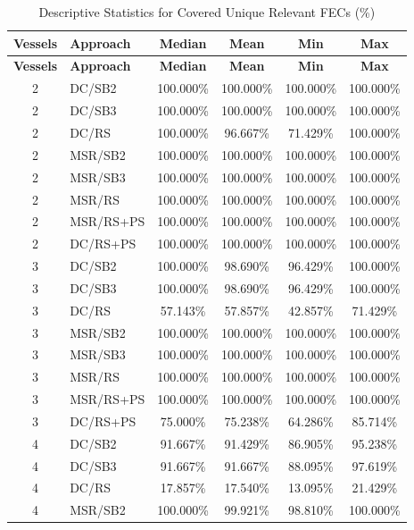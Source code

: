 \documentclass[10pt,a4paper]{article}
\begin{document}
\begin{longtable}{c l c c c c}
\caption{Descriptive Statistics for Covered Unique Relevant FECs (\%)} \\
\toprule
\textbf{Vessels} & \textbf{Approach} & \textbf{Median} & \textbf{Mean} & \textbf{Min} & \textbf{Max} \\
\midrule
\endfirsthead
\toprule
\textbf{Vessels} & \textbf{Approach} & \textbf{Median} & \textbf{Mean} & \textbf{Min} & \textbf{Max} \\
\midrule
\endhead
\bottomrule
\endfoot

2 & DC/SB2 & 100.000\% & 100.000\% & 100.000\% & 100.000\% \\
2 & DC/SB3 & 100.000\% & 100.000\% & 100.000\% & 100.000\% \\
2 & DC/RS & 100.000\% & 96.667\% & 71.429\% & 100.000\% \\
2 & MSR/SB2 & 100.000\% & 100.000\% & 100.000\% & 100.000\% \\
2 & MSR/SB3 & 100.000\% & 100.000\% & 100.000\% & 100.000\% \\
2 & MSR/RS & 100.000\% & 100.000\% & 100.000\% & 100.000\% \\
2 & MSR/RS+PS & 100.000\% & 100.000\% & 100.000\% & 100.000\% \\
2 & DC/RS+PS & 100.000\% & 100.000\% & 100.000\% & 100.000\% \\
\midrule
3 & DC/SB2 & 100.000\% & 98.690\% & 96.429\% & 100.000\% \\
3 & DC/SB3 & 100.000\% & 98.690\% & 96.429\% & 100.000\% \\
3 & DC/RS & 57.143\% & 57.857\% & 42.857\% & 71.429\% \\
3 & MSR/SB2 & 100.000\% & 100.000\% & 100.000\% & 100.000\% \\
3 & MSR/SB3 & 100.000\% & 100.000\% & 100.000\% & 100.000\% \\
3 & MSR/RS & 100.000\% & 100.000\% & 100.000\% & 100.000\% \\
3 & MSR/RS+PS & 100.000\% & 100.000\% & 100.000\% & 100.000\% \\
3 & DC/RS+PS & 75.000\% & 75.238\% & 64.286\% & 85.714\% \\
\midrule
4 & DC/SB2 & 91.667\% & 91.429\% & 86.905\% & 95.238\% \\
4 & DC/SB3 & 91.667\% & 91.667\% & 88.095\% & 97.619\% \\
4 & DC/RS & 17.857\% & 17.540\% & 13.095\% & 21.429\% \\
4 & MSR/SB2 & 100.000\% & 99.921\% & 98.810\% & 100.000\% \\

\end{longtable}
\end{document}
